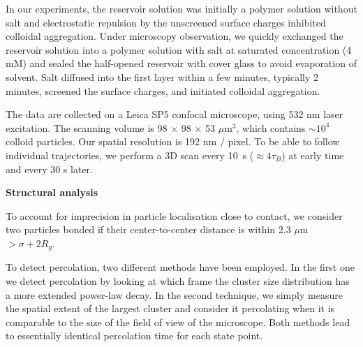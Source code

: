 \documentclass[preprint,amsmath,amssymb,superscriptaddress]{revtex4}
\begin{document}
In our experiments, the reservoir solution was initially a polymer solution without salt and electrostatic repulsion by the unscreened surface charges inhibited colloidal aggregation. Under microscopy observation, we quickly exchanged the reservoir solution into a polymer solution with salt at saturated concentration (4 mM) and sealed the half-opened reservoir with cover glass to avoid evaporation of solvent. Salt diffused into the first layer within a few minutes, typically 2 minutes, screened the surface charges, and initiated colloidal aggregation. 

The data are collected on a Leica SP5 confocal microscope, using 532 nm laser excitation. The scanning volume is 98 $\times$ 98 $\times$ 53 $\mu$m$^3$, which contains $\sim 10^4$ colloid particles. Our spatial resolution is 192 nm / pixel. To be able to follow individual trajectories, we perform a 3D scan every 10~s ($\approx 4\tau_B$) at early time and every 30 s later.





%

\noindent
{\bf Structural analysis}

To account for imprecision in particle localisation close to contact, we consider two particles bonded if their center-to-center distance is within 2.3 $\mu$m $>\sigma+2R_g$.

To detect percolation, two different methods have been employed. In the first one we detect percolation
by looking at which frame the cluster size distribution has a more extended power-law decay. In the second technique,
we simply measure the spatial extent of the largest cluster and consider it percolating when it is comparable to the
size of the field of view of the microscope. Both methods lead to essentially identical percolation time for each state point.
\end{document}
